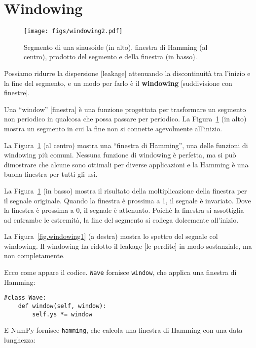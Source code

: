 \documentclass[12pt]{book} \usepackage[width=5.5in,height=8.5in, hmarginratio=3:2,vmarginratio=1:1]{geometry}
\begin{document}
\section{Windowing} 

\begin{figure} 

\centerline{\texttt{[image: figs/windowing2.pdf]}} \caption{Segmento di una sinusoide (in alto), finestra di Hamming (al centro), prodotto del segmento e della finestra (in basso).} \label{fig.windowing2} \end{figure} 

Possiamo ridurre la dispersione [leakage] attenuando la discontinuità tra l'inizio e la fine del segmento, e un modo per farlo è il {\bf windowing} [suddivisione con finestre].

Una ``window'' [finestra] è una funzione progettata per trasformare un segmento non periodico in qualcosa che possa passare per periodico. La Figura~\ref{fig.windowing2} (in alto) mostra un segmento in cui la fine non si connette agevolmente all'inizio.

La Figura~\ref{fig.windowing2} (al centro) mostra una ``finestra di Hamming'', una delle funzioni di windowing più comuni. Nessuna funzione di windowing è perfetta, ma si può dimostrare che alcune sono ottimali per diverse applicazioni e la Hamming è una buona finestra per tutti gli usi.

La Figura~\ref{fig.windowing2} (in basso) mostra il risultato della moltiplicazione della finestra per il segnale originale. Quando la finestra è prossima a 1, il segnale è invariato. Dove la finestra è prossima a 0, il segnale è attenuato. Poiché la finestra si assottiglia ad entrambe le estremità, la fine del segmento si collega dolcemente all'inizio.

La Figura~\ref{fig.windowing1} (a destra) mostra lo spettro del segnale col windowing. Il windowing ha ridotto il leakage [le perdite] in modo sostanziale, ma non completamente.

Ecco come appare il codice. {\tt Wave} fornisce {\tt window}, che applica una finestra di Hamming:

\begin{verbatim} 
#class Wave:
    def window(self, window):
        self.ys *= window
 \end{verbatim} 

E NumPy fornisce {\tt hamming}, che calcola una finestra di Hamming con una data lunghezza:
\end{document}
